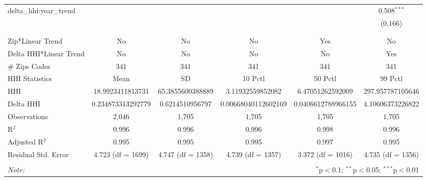 \begin{table}[H]
{\begin{tabular}{@{\extracolsep{5pt}}lccccc}
  delta\_hhi:year\_trend &  &  &  &  & 0.508$^{***}$ \\  

   &  &  &  &  & (0.166) \\  

   & & & & & \\  

 \hline \\[-1.8ex]  

 Zip*Linear Trend & No & No & No & Yes & No \\  

 Delta HHI*Linear Trend & No & No & No & No & Yes \\  

 # Zips Codes & 341 & 341 & 341 & 341 & 341 \\  

 HHI Statistics & Mean & SD & 10 Pctl & 50 Pctl & 99 Pctl \\  

 HHI & 18.9923411813731 & 65.3855600388889 & 3.11932559852082 & 6.47051262592009 & 297.957787105646 \\  

 Delta HHI & 0.234873313292779 & 0.6214510956797 & 0.00668040112602169 & 0.0406612788966155 & 4.10606373226822 \\  

 Observations & 2,046 & 1,705 & 1,705 & 1,705 & 1,705 \\  

 R$^{2}$ & 0.996 & 0.996 & 0.996 & 0.998 & 0.996 \\  

 Adjusted R$^{2}$ & 0.995 & 0.995 & 0.995 & 0.997 & 0.995 \\  

 Residual Std. Error & 4.723 (df = 1699) & 4.747 (df = 1358) & 4.739 (df = 1357) & 3.372 (df = 1016) & 4.735 (df = 1356) \\  

 \hline  

 \hline \\[-1.8ex]  

 \textit{Note:}  & \multicolumn{5}{r}{$^{*}$p$<$0.1; $^{**}$p$<$0.05; $^{***}$p$<$0.01} \\  

 \end{tabular}}  

 \end{table}  

 


